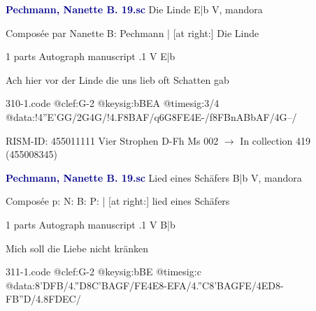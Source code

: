 \documentclass[twocolumn]{book}
\begin{document}
\newline \par \vspace{7pt} \textcolor{darkblue}{\textbf{Pechmann, Nanette B.  19.sc}}
\newline Die Linde  E|b  
\newline V, mandora
\newline \begin{itshape}[heading, f.37v:] Composée par Nanette B: Pechmann | [at right:] Die Linde\end{itshape} 
\newline \textcolor{darkblue}{}  1 parts  
\newline Autograph manuscript
.1  V  E|b
\newline \begin{footnotesize} Ach hier vor der Linde die uns lieb oft Schatten gab \end{footnotesize}  
\begin{filecontents*}{310-1.code}
@clef:G-2
@keysig:bBEA
@timesig:3/4
@data:!4''E'GG/2G4G/!4.F8BAF/q6G{8FE}4E-/f{8FBnABbAF}/4G--/
\end{filecontents*}
\newline
%

\newline RISM-ID: 455011111
\newline Vier Strophen
\newline D-Fh  Ms 002
\newline $\rightarrow$ In collection 419 (455008345)

\newline \par \vspace{7pt} \textcolor{darkblue}{\textbf{Pechmann, Nanette B.  19.sc}}
\newline Lied eines Schäfers  B|b  
\newline V, mandora
\newline \begin{itshape}[heading, f.38v:] Composée p: N: B: P: | [at right:] lied eines Schäfers\end{itshape} 
\newline \textcolor{darkblue}{}  1 parts  
\newline Autograph manuscript
.1  V  B|b
\newline \begin{footnotesize} Mich soll die Liebe nicht kränken \end{footnotesize}  
\begin{filecontents*}{311-1.code}
@clef:G-2
@keysig:bBE
@timesig:c
@data:8'DFB/4.''D8C'BAGF/{FE}4E8-EFA/4.''C8'BAGFE/4ED8-FB''D/4.8FDEC/
\end{filecontents*}
\newline
%
\end{document}
